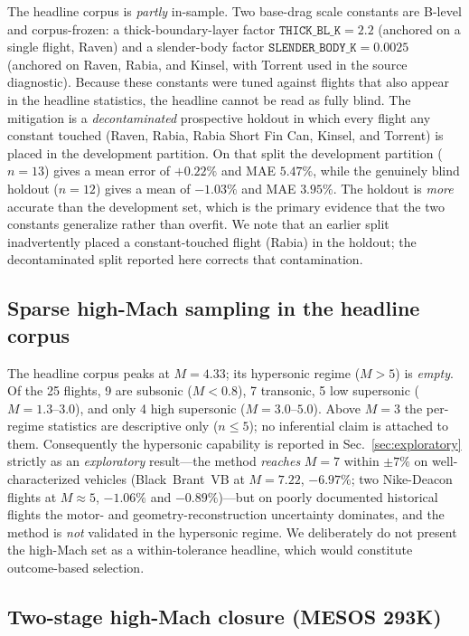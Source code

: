 The headline corpus is \emph{partly} in-sample. Two base-drag scale constants
are B-level and corpus-frozen: a thick-boundary-layer factor
$\mathtt{THICK\_BL\_K} = 2.2$ (anchored on a single flight, Raven) and a
slender-body factor $\mathtt{SLENDER\_BODY\_K} = 0.0025$ (anchored on
Raven, Rabia, and Kinsel, with Torrent used in the source diagnostic). Because
these constants were tuned against flights that also appear in the headline
statistics, the headline cannot be read as fully blind. The mitigation is a
\emph{decontaminated} prospective holdout in which every flight any constant
touched (Raven, Rabia, Rabia Short Fin Can, Kinsel, and Torrent) is placed in
the development partition. On that split the development partition ($n = 13$)
gives a mean error of $+0.22\%$ and MAE $5.47\%$, while the genuinely blind
holdout ($n = 12$) gives a mean of $-1.03\%$ and MAE $3.95\%$. The holdout is
\emph{more} accurate than the development set, which is the primary evidence
that the two constants generalize rather than overfit. We note that an earlier
split inadvertently placed a constant-touched flight (Rabia) in the holdout; the
decontaminated split reported here corrects that contamination.

\subsection{Sparse high-Mach sampling in the headline corpus}
\label{sec:lim-sparse}

The headline corpus peaks at $M = 4.33$; its hypersonic regime ($M > 5$) is
\emph{empty}. Of the 25 flights, 9 are subsonic ($M < 0.8$), 7 transonic, 5 low
supersonic ($M = 1.3$--$3.0$), and only 4 high supersonic ($M = 3.0$--$5.0$).
Above $M = 3$ the per-regime statistics are descriptive only ($n \le 5$); no
inferential claim is attached to them. Consequently the hypersonic capability is
reported in Sec.~\ref{sec:exploratory} strictly as an \emph{exploratory}
result---the method \emph{reaches} $M = 7$ within $\pm 7\%$ on
well-characterized vehicles (Black~Brant~VB at $M = 7.22$, $-6.97\%$; two
Nike-Deacon flights at $M \approx 5$, $-1.06\%$ and $-0.89\%$)---but on poorly
documented historical flights the motor- and geometry-reconstruction uncertainty
dominates, and the method is \emph{not} validated in the hypersonic regime. We
deliberately do not present the high-Mach set as a within-tolerance headline,
which would constitute outcome-based selection.

\subsection{Two-stage high-Mach closure (MESOS 293K)}
\label{sec:lim-mesos}

